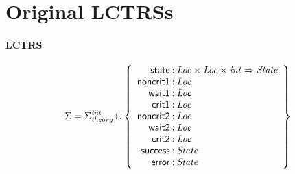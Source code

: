 \documentclass[a4paper]{article}
\newcommand{\Sort}[1]{\mathit{#1}}
\newcommand{\symb}[1]{\mathsf{#1}}
\newcommand{\Sigmainttheory}{\Sigma^{\mathit{int}}_{\mathit{theory}}}
\begin{document}

\section*{Original LCTRSs}

\paragraph{LCTRS}

\[
\Sigma = 
\Sigmainttheory \cup\left\{
\begin{array}{r@{\>}c@{\>}l}
\symb{state} & : & \Sort{Loc} \times \Sort{Loc} \times \Sort{int} \Rightarrow \Sort{State}\\
\symb{noncrit1} & : & \Sort{Loc}\\
\symb{wait1} & : & \Sort{Loc}\\
\symb{crit1} & : & \Sort{Loc}\\
\symb{noncrit2} & : & \Sort{Loc}\\
\symb{wait2} & : & \Sort{Loc}\\
\symb{crit2} & : & \Sort{Loc}\\
\symb{success} & : & \Sort{State}\\
\symb{error} & : & \Sort{State}\\
\end{array}
\right\}
\]
\end{document}
